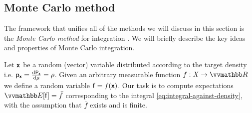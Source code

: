 \subsection{Monte Carlo method}

The framework that unifies all of the methods we will discuss in this section is the \emph{Monte Carlo method} for integration \citep{ulam1949monte}. We will briefly describe the key ideas and properties of Monte Carlo integration. 

Let $\boldsymbol{\mathsf{x}}$ be a random (vector) variable distributed according to the target density i.e. $\mathsf{p}_{\boldsymbol{\mathsf{x}}} = \frac{\mathrm{d} \mathsf{P}_{\boldsymbol{\mathsf{x}}}}{\mathrm{d} \mu} = \rho$. Given an arbitrary measurable function $f : \set{X} \to \reals$ we define a random variable $\mathsf{f} = f(\boldsymbol{\mathsf{x}})$. Our task is to compute expectations $\expc{\rvar{f}} = \bar{f}$ corresponding to the integral \eqref{eq:integral-against-density}, with the assumption that $\bar{f}$ exists and is finite.


